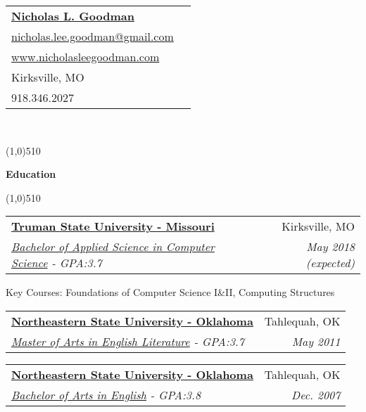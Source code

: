\documentclass[letterpaper,11pt]{article}
\makeatletter
\newcommand{\resitem}[1]{\item #1 \vspace{-2pt}}
\newcommand{\resheading}[1]{{\large {\begin{minipage}{\textwidth}{\textbf{#1 \vphantom{p\^{E}}}}\end{minipage}}}}
\newcommand{\ressubheading}[4]{
\begin{tabular*}{6.5in}{l@{\extracolsep{\fill}}r}
		\textbf{#1} & #2 \\
		\textit{#3} & \textit{#4} \\
\end{tabular*}\vspace{-6pt}}
\makeatother
\begin{document}
\newcommand{\mywebheader}{
\begin{tabular*}{7in}{l@{\extracolsep{\fill}}r}
	\textbf{\href{http://www.nicholasleegoodman.com/}{\LARGE Nicholas L. Goodman}}\\
	\href{mailto:nicholas.lee.goodman@gmail.com}{nicholas.lee.goodman@gmail.com}\\
	\href{http://www.nicholasleegoodman.com}{www.nicholasleegoodman.com} \\ 	
	{Kirksville, MO} \\
	{918.346.2027}
	\end{tabular*}
\\
\renewcommand{\labelitemi}{$-$}

\vspace{0.1in}}

\mywebheader


\line(1,0){510}

\resheading {Education}

\line(1,0){510}

	\begin{description}

		\item
			\ressubheading {\href{http://www.truman.edu}{Truman State University - Missouri}}{Kirksville, MO}{\href{http://www.truman.edu/majors-programs/majors-minors/computer-science-major/}{Bachelor of Applied Science in Computer Science} - {GPA:3.7}}{ \footnotesize{May 2018 (expected)}}
				{ \footnotesize
				\begin{description}				
					\resitem{Key Courses: Foundations of Computer Science I\&II, Computing Structures}
				\end{description}
				}
		\item	
			\ressubheading{\href{http://www.nsuok.edu}{Northeastern State University - Oklahoma}}{Tahlequah, OK}{\href{https://www.nsuok.edu/Academics/DegreesMajors/GraduateMasters.aspx}{Master of Arts in English Literature} - {GPA:3.7}}{ \footnotesize{May 2011}}
		\item	
			\ressubheading{\href{http://www.nsuok.edu}{Northeastern State University - Oklahoma}}{Tahlequah, OK}{\href{https://www.nsuok.edu/Academics/DegreesMajors/Tahlequah.aspx}{Bachelor of Arts in English} - {GPA:3.8}}{ \footnotesize{Dec. 2007}}
		\end{description} %

\end{document}
